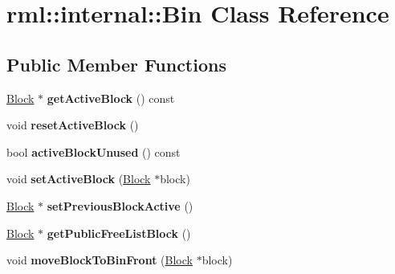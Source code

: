 \hypertarget{classrml_1_1internal_1_1Bin}{}\section{rml\+:\+:internal\+:\+:Bin Class Reference}
\label{classrml_1_1internal_1_1Bin}
\subsection*{Public Member Functions}
\begin{DoxyCompactItemize}
\item 
\hypertarget{classrml_1_1internal_1_1Bin_a9a2ebfbb3a7cbbbffd553da85df5cd8f}{}\hyperlink{classrml_1_1internal_1_1Block}{Block} $\ast$ {\bfseries get\+Active\+Block} () const \label{classrml_1_1internal_1_1Bin_a9a2ebfbb3a7cbbbffd553da85df5cd8f}

\item 
\hypertarget{classrml_1_1internal_1_1Bin_aa29fffd63036693e7b999971c9221d5b}{}void {\bfseries reset\+Active\+Block} ()\label{classrml_1_1internal_1_1Bin_aa29fffd63036693e7b999971c9221d5b}

\item 
\hypertarget{classrml_1_1internal_1_1Bin_a75a1299c5c75ae7855e766cf54b2d587}{}bool {\bfseries active\+Block\+Unused} () const \label{classrml_1_1internal_1_1Bin_a75a1299c5c75ae7855e766cf54b2d587}

\item 
\hypertarget{classrml_1_1internal_1_1Bin_a7c2d26793546cc9e053163731fdf43e5}{}void {\bfseries set\+Active\+Block} (\hyperlink{classrml_1_1internal_1_1Block}{Block} $\ast$block)\label{classrml_1_1internal_1_1Bin_a7c2d26793546cc9e053163731fdf43e5}

\item 
\hypertarget{classrml_1_1internal_1_1Bin_adde6cbfe4fe734a4cfeef1626c327e9a}{}\hyperlink{classrml_1_1internal_1_1Block}{Block} $\ast$ {\bfseries set\+Previous\+Block\+Active} ()\label{classrml_1_1internal_1_1Bin_adde6cbfe4fe734a4cfeef1626c327e9a}

\item 
\hypertarget{classrml_1_1internal_1_1Bin_a5a1a32653f4a65095acd2e5d7506c41f}{}\hyperlink{classrml_1_1internal_1_1Block}{Block} $\ast$ {\bfseries get\+Public\+Free\+List\+Block} ()\label{classrml_1_1internal_1_1Bin_a5a1a32653f4a65095acd2e5d7506c41f}

\item 
\hypertarget{classrml_1_1internal_1_1Bin_a2921922f5d5860c5ed5cb66d74ce8720}{}void {\bfseries move\+Block\+To\+Bin\+Front} (\hyperlink{classrml_1_1internal_1_1Block}{Block} $\ast$block)\label{classrml_1_1internal_1_1Bin_a2921922f5d5860c5ed5cb66d74ce8720}


\end{DoxyCompactItemize}

